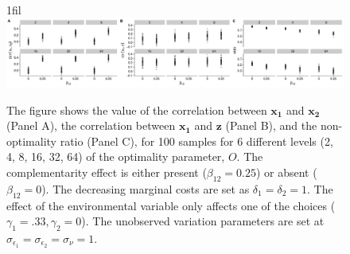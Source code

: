 \documentclass[12pt]{article}
\makeatletter
\newcommand*{\centerfloat}{%
  \parindent \z@
  \leftskip \z@ \@plus 1fil \@minus \textwidth
  \rightskip\leftskip
  \parfillskip \z@skip}
\makeatother
\begin{document}
\begin{figure}
\centerfloat
\includegraphics[width=450px]{figure-latex/sample_descriptives.pdf}
\caption[Calibration of Simulated Samples]{\label{calibration} The figure shows the value of the correlation between $\mathbf{x_1}$ and $\mathbf{x_2}$ (Panel A), the correlation between $\mathbf{x_1}$ and $\mathbf{z}$ (Panel B), and the non-optimality ratio (Panel C),  for 100 samples for 6 different levels (2, 4, 8, 16, 32, 64) of the optimality parameter, $O$. The complementarity effect is either present ($\beta_{12} = 0.25$) or absent ($\beta_{12} = 0$). The decreasing marginal costs are set as $\delta_1 = \delta_2 = 1$. The effect of the environmental variable only affects one of the choices
($\gamma_1 = .33, \gamma_2 = 0$). The unobserved variation parameters are set at $\sigma_{\epsilon_1} = \sigma_{\epsilon_2} = \sigma_{\nu} = 1.$}
\end{figure}
\end{document}
